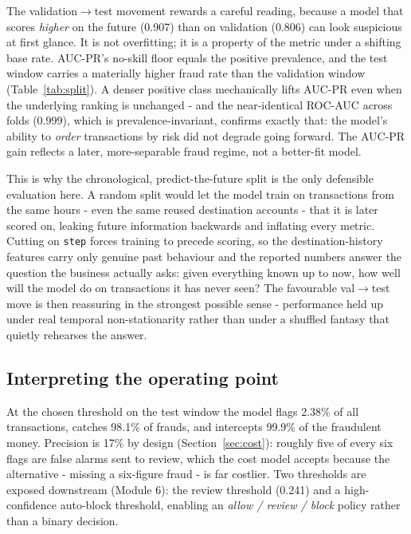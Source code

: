 \documentclass[11pt,a4paper]{report}
\newcommand{\code}[1]{\texttt{\small #1}}
\begin{document}
The validation$\to$test movement rewards a careful reading, because a model that scores \emph{higher} on the future (0.907) than on validation (0.806) can look suspicious at first glance. It is not overfitting; it is a property of the metric under a shifting base rate. AUC-PR's no-skill floor equals the positive prevalence, and the test window carries a materially higher fraud rate than the validation window (Table~\ref{tab:split}). A denser positive class mechanically lifts AUC-PR even when the underlying ranking is unchanged - and the near-identical ROC-AUC across folds (0.999), which is prevalence-invariant, confirms exactly that: the model's ability to \emph{order} transactions by risk did not degrade going forward. The AUC-PR gain reflects a later, more-separable fraud regime, not a better-fit model.

This is why the chronological, predict-the-future split is the only defensible evaluation here. A random split would let the model train on transactions from the same hours - even the same reused destination accounts - that it is later scored on, leaking future information backwards and inflating every metric. Cutting on \code{step} forces training to precede scoring, so the destination-history features carry only genuine past behaviour and the reported numbers answer the question the business actually asks: given everything known up to now, how well will the model do on transactions it has never seen? The favourable val$\to$test move is then reassuring in the strongest possible sense - performance held up under real temporal non-stationarity rather than under a shuffled fantasy that quietly rehearses the answer.

\subsection{Interpreting the operating point}

At the chosen threshold on the test window the model flags 2.38\% of all transactions,
catches 98.1\% of frauds, and intercepts 99.9\% of the fraudulent money. Precision is 17\%
by design (Section~\ref{sec:cost}): roughly five of every six flags are false alarms sent to
review, which the cost model accepts because the alternative - missing a six-figure fraud -
is far costlier. Two thresholds are exposed downstream (Module 6): the review threshold
(0.241) and a high-confidence auto-block threshold, enabling an \emph{allow / review / block}
policy rather than a binary decision.
\end{document}
